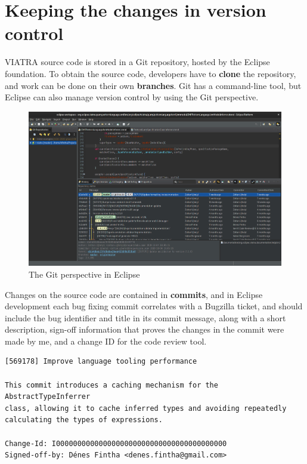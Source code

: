 \documentclass[11pt,a4paper,oneside]{report}
\begin{document}
\pagebreak

\section{Keeping the changes in version control}
VIATRA source code is stored in a Git repository, hosted by the Eclipse
foundation. To obtain the source code, developers have to \textbf{clone} the
repository, and work can be done on their own \textbf{branches}. Git has a
command-line tool, but Eclipse can also manage version control by using the
Git perspective.

\begin{figure}[ht]
\centering
\includegraphics[width=150mm, keepaspectratio]{figures/eclipse-git.png}
\caption{The Git perspective in Eclipse}
\label{fig:eclipse-git}
\end{figure}

Changes on the source code are contained in \textbf{commits}, and in Eclipse
development each bug fixing commit correlates with a Bugzilla ticket, and
should include the bug identifier and title in its commit message, along with
a short description, sign-off information that proves the changes in the commit
were made by me, and a change ID for the code review tool.

\begin{lstlisting}
[569178] Improve language tooling performance

This commit introduces a caching mechanism for the AbstractTypeInferrer
class, allowing it to cache inferred types and avoiding repeatedly
calculating the types of expressions.

Change-Id: I0000000000000000000000000000000000000000
Signed-off-by: Dénes Fintha <denes.fintha@gmail.com>
\end{lstlisting}
\end{document}
